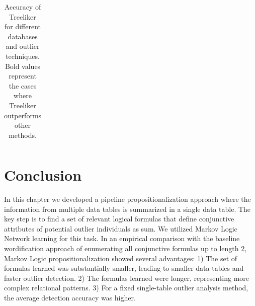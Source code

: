 \begin{table}
{\begin{tabular}{llcccc}
				\end{tabular}
				
			}
			\caption{Accuracy of Treeliker for different databases and outlier techniques. Bold values represent the cases where Treeliker outperforms other methods. 
				\label{table:Treeliker}}
		\end{table}
%			
%			
%					
	\section{Conclusion}		
	In this chapter we developed a pipeline propositionalization approach where the information from multiple data tables is summarized in a single data table. The key step is to find a set of relevant logical formulas that define conjunctive attributes of potential outlier individuals as sum. We utilized Markov Logic Network learning for this task. In an empirical comparison with the baseline wordification approach of enumerating all conjunctive formulas up to length 2, Markov Logic propositionalization showed several advantages: 1) The set of formulas learned was substantially smaller, leading to smaller data tables and faster outlier detection. 2) The formulas learned were longer, representing more complex relational patterns. 3) For a fixed single-table outlier analysis method, the average detection accuracy was higher.
	
